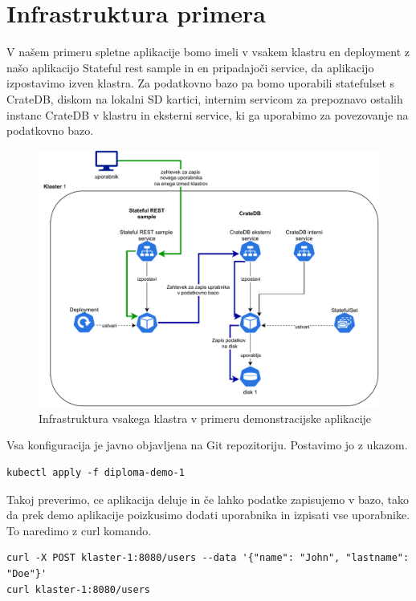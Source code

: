 \documentclass[a4paper, 12pt]{book}
\begin{document}
\section{Infrastruktura primera}
V našem primeru spletne aplikacije bomo imeli v vsakem klastru en deployment z našo aplikacijo Stateful rest sample in en pripadajoči service, da aplikacijo izpostavimo izven klastra.
Za podatkovno bazo pa bomo uporabili statefulset s CrateDB, diskom na lokalni SD kartici, internim servicom za prepoznavo ostalih instanc CrateDB v klastru in eksterni service, ki ga uporabimo za povezovanje na podatkovno bazo.
\begin{figure}[h]
\begin{center}
\includegraphics[width=1.0\textwidth]{images/infrastructure-example.pdf}
\end{center}
\caption{Infrastruktura vsakega klastra v primeru demonstracijske aplikacije}
\label{primer-uporabe-helm-predloge-argo-cd}
\end{figure}
Vsa konfiguracija je javno objavljena na Git repozitoriju\cite{git-diploma}. Postavimo jo z ukazom.
\begin{verbatim}
kubectl apply -f diploma-demo-1
\end{verbatim}
Takoj preverimo, ce aplikacija deluje in če lahko podatke zapisujemo v bazo, tako da prek demo aplikacije poizkusimo dodati uporabnika in izpisati vse uporabnike. To naredimo z curl komando.
\begin{verbatim}
curl -X POST klaster-1:8080/users --data '{"name": "John", "lastname": "Doe"}'
curl klaster-1:8080/users
\end{verbatim}
\end{document}
